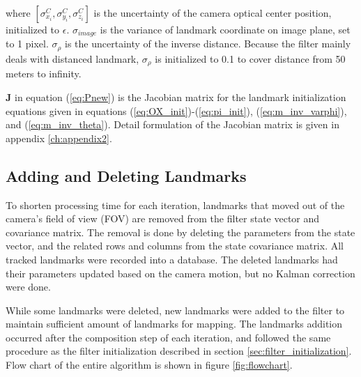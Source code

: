 \noindent where $[\sigma_{x_{i}}^{C}, \sigma_{y_{i}}^{C}, \sigma
_{z_{i}}^{C}]$ is the uncertainty of the camera optical center
position, initialized to $\epsilon$. $\sigma_{image}$ is the
variance of landmark coordinate on image plane, set to 1 pixel. $\sigma
_{\rho }$ is the uncertainty of the inverse distance. Because the
filter mainly deals with distanced landmark, $ \sigma _{\rho }$ is
initialized to 0.1 to cover distance from 50 meters to infinity.

$\mathbf{J}$ in equation (\ref{eq:Pnew}) is the Jacobian matrix for
the landmark initialization equations given in equations
(\ref{eq:OX_init})-(\ref{eq:pi_init}),
(\ref{eq:m_inv_varphi}), and (\ref{eq:m_inv_theta}). Detail
formulation of the Jacobian matrix is given in appendix
\ref{ch:appendix2}.



\subsection{Adding and Deleting Landmarks}
To shorten processing time for each iteration, landmarks that moved
out of the camera's field of view (FOV) are removed from the filter
state vector and covariance matrix. The removal is done by deleting
the parameters from the state vector, and the related rows and columns
from the state covariance matrix. All tracked landmarks were recorded
into a database. The deleted landmarks had their parameters updated
based on the camera motion, but no Kalman correction were done.

While some landmarks were deleted, new landmarks were added to the
filter to maintain sufficient amount of landmarks for mapping. The
landmarks addition occurred after the composition step of each
iteration, and followed the same procedure as the filter
initialization described in section \ref{sec:filter_initialization}.
Flow chart of the entire algorithm is shown in figure
\ref{fig:flowchart}.

